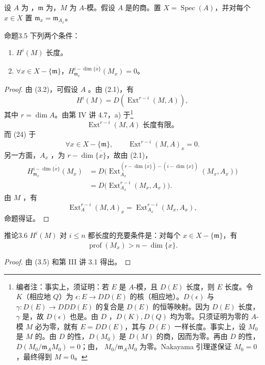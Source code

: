 设 $A$ 为 ，$\mathfrak m$ 为，$M$ 为 $A$-模。假设 $A$ 是的商。置 $X=\operatorname{Spec}(A)$，并对每个 $x\in X$ 置 $\mathfrak m_x=\mathfrak m_{A_x}$。
\begin{SGAresult}{命题}{3.5}
下列两个条件：
\begin{enumerate}
\item[a)] $H^i(M)$ 长度。
\item[b)] $\forall x\in X-\{\mathfrak m\}$，$H^{i-\dim\overline{\{x\}}}_{\mathfrak m_x}(M_x)=0$。
\end{enumerate}
\end{SGAresult}
\begin{proof}
由 (3.2)，可假设 $A$ 。由 (2.1)，有
\[H^i(M)=D(\operatorname{Ext}^{r-i}(M,A)),\]
其中 $r=\dim A$。由第 IV 讲 4.7，a) 于\footnote[4]{编者注：事实上，须证明：若 $E$ 是 $A$-模，且 $D(E)$ 长度，则 $E$ 长度。令 $K$（相应地 $Q$）为 $\epsilon:E\to DD(E)$ 的核（相应地）。$D(\epsilon)$ 与 $\gamma:D(E)\to DDD(E)$ 的复合是 $D(E)$ 的恒等映射。因为 $D(E)$ 长度，$\gamma$ 是，故 $D(\epsilon)$ 也是。由 $D$ ，$D(K),D(Q)$ 均为零。只须证明为零的 $A$-模 $M$ 必为零，就有 $E=DD(E)$，其与 $D(E)$ 一样长度。事实上，设 $M_0$ 是 $M$ 的。由 $D$ 的性，$D(M_0)$ 是 $D(M)$ 的商，因而为零。再由 $D$ 的性，$D(M_0/\mathfrak m_A M_0)=0$；由， $M_0/\mathfrak m_A M_0$ 为零。Nakayama 引理遂保证 $M_0=0$，最终得到 $M=0$。}
\[\operatorname{Ext}^{r-i}(M,A)\text{ 长度有限。}\tag{24}\]
而 (24) 于
\[\forall x\in X-\{\mathfrak m\},\qquad\operatorname{Ext}^{r-i}(M,A)_x=0.\tag{25}\]
另一方面，$A_x$ ，为 $r-\dim\overline{\{x\}}$，故由 (2.1)，
\[\begin{aligned}
H^{i-\dim\overline{\{x\}}}_{\mathfrak m_x}(M_x)
&=D\bigl(\operatorname{Ext}^{(r-\dim\overline{\{x\}})-(i-\dim\overline{\{x\}})}_{A_x}(M_x,A_x)\bigr)\\
&=D\bigl(\operatorname{Ext}^{r-i}_{A_x}(M_x,A_x)\bigr).
\end{aligned}\tag{26}\]
由 $M$ ，有
\[\operatorname{Ext}^{r-i}_A(M,A)_x=\operatorname{Ext}^{r-i}_{A_x}(M_x,A_x),\]
命题得证。
\end{proof}
\begin{SGAresult}{推论}{3.6}
$H^i(M)$ 对 $i\le n$ 都长度的充要条件是：对每个 $x\in X-\{\mathfrak m\}$，有
\[\operatorname{prof}(M_x)>n-\dim\overline{\{x\}}.\]
\end{SGAresult}
\begin{proof}
由 (3.5) 和第 III 讲 3.1 得出。
\end{proof}
